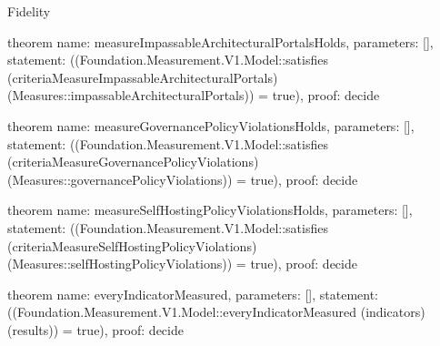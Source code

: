 \begin{lexlean}{Fidelity}
\begin{semanticmodule}
theorem{
  name: measureImpassableArchitecturalPortalsHolds,
  parameters: [],
  statement: ((Foundation.Measurement.V1.Model::satisfies (criteriaMeasureImpassableArchitecturalPortals) (Measures::impassableArchitecturalPortals)) = true),
  proof: decide{}
}

theorem{
  name: measureGovernancePolicyViolationsHolds,
  parameters: [],
  statement: ((Foundation.Measurement.V1.Model::satisfies (criteriaMeasureGovernancePolicyViolations) (Measures::governancePolicyViolations)) = true),
  proof: decide{}
}

theorem{
  name: measureSelfHostingPolicyViolationsHolds,
  parameters: [],
  statement: ((Foundation.Measurement.V1.Model::satisfies (criteriaMeasureSelfHostingPolicyViolations) (Measures::selfHostingPolicyViolations)) = true),
  proof: decide{}
}

theorem{
  name: everyIndicatorMeasured,
  parameters: [],
  statement: ((Foundation.Measurement.V1.Model::everyIndicatorMeasured (indicators) (results)) = true),
  proof: decide{}
}
\end{semanticmodule}
\end{lexlean}
